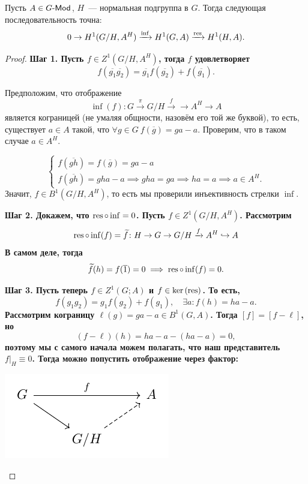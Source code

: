 	 \begin{statement} 
	 	Пусть $A \in G\text{-}\mathsf{Mod}$, $H$~--- нормальная подгруппа в $G$. Тогда следующая последовательность точна: 
	 	\[
	 		0 \to H^{1}(G/H, A^H) \xrightarrow{\inf} H^1(G, A) \xrightarrow{\operatorname{res}} H^1(H, A).
	 	\]
	 \end{statement}
	 \begin{proof}
	 	\noindent\bf{Шаг 1.} Пусть $f \in Z^1(G/H, A^H)$, тогда $f$ удовлетворяет 
	 	\[
	 		f(\overline{g_1} \overline{g_2}) = \overline{g_1} f(\overline{g_2}) + f(\overline{g_1}). 
	 	\]

	 	Предположим, что отображение 
	 	\[
	 		\inf(f) \colon G \xrightarrow{\pi} G/H \xrightarrow{f} \to A^H \to A
	 	\]
	 	является кограницей (не умаляя общности, назовём его той же буквой), то есть, существует $a \in A$ такой, что $\forall g \in G \ f(\overline{g}) = ga - a$. Проверим, что в таком случае $a \in A^H$. 

	 	\[
	 		\begin{cases} f(\overline{gh}) = f(\overline{g}) = ga - a \\ f(\overline{gh}) = g h a - a \implies gha = ga \implies h a = a \implies a \in A^H. \end{cases}
	 	\]
	 	Значит, $f \in B^{1}(G/H, A^H)$, то есть  мы проверили инъективность стрелки $\inf$.

	 	\noindent\bf{Шаг 2.} Докажем, что $\operatorname{res} \circ \inf = 0$. Пусть $f \in Z^1(G/H, A^H)$. Рассмотрим 
	 	\[
	 		\operatorname{res} \circ \inf(f) = \widetilde{f}\colon H \to G \to G/H \xrightarrow{f} A^H \hookrightarrow A
	 	\]
	 	В самом деле, тогда 
	 	\[
	 		\widetilde{f}(h) = f(\overline{1}) = 0 \implies \operatorname{res} \circ \inf(f) = 0.
	 	\]

	 	\noindent\bf{Шаг 3.} Пусть теперь $f \in Z^1(G; A)$ и $f \in \ker{(\operatorname{res})}$. То есть, 
	 	\[
	 		f(g_1 g_2) = g_1 f(g_2) + f(g_1), \quad \exists a \colon f(h) = ha - a.
	 	\]
	 	Рассмотрим кограницу $\ell(g) = ga - a \in B^{1}(G, A)$. Тогда $[f] = [f - \ell]$, но 
	 	\[
	 		(f - \ell)(h) = ha - a - (ha - a) = 0, 
	 	\]
	 	поэтому мы с самого начала можем полагать, что наш представитель $f\vert_{H} \equiv 0$. Тогда можно попустить отображение через фактор: 

	 	\begin{center}
	 		\includegraphics{lectures/6/pictures/cd_10.pdf}
	 	\end{center}


\end{proof}
